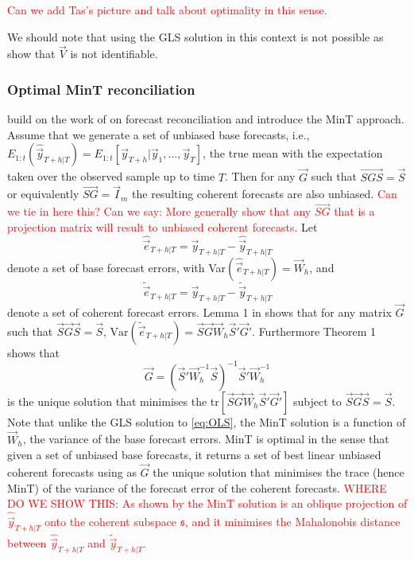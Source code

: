 \documentclass[graybox]{svmult}
\begin{document}
\textcolor{red}{Can we add Tas's picture and talk about optimality in this sense.}

We should note that using the GLS solution in this context is not possible as \cite{WicEtAl2019} show that $\vec{V}$ is not identifiable.


\subsubsection{Optimal MinT reconciliation}

\cite{WicEtAl2019} build on the work of \citet{HynEtAl2011} on forecast reconciliation and introduce the MinT approach. Assume that we generate a set of unbiased base forecasts, i.e., $E_{1:t}(\hat{\vec{y}}_{T+h|T})= E_{1:t}[\vec{y}_{T+h}|\vec{y}_1,...,\vec{y}_T]$, the true mean with the expectation taken over the observed sample up to time $T$. Then for any $\vec{G}$ such that $\vec{SGS}=\vec{S}$ or equivalently $\vec{SG}=\vec{I}_m$ the resulting coherent forecasts are also unbiased. \textcolor{red}{Can we tie in here this? Can we say: More generally \citep{Gamakumara2018} show that any $\vec{SG}$ that is a projection matrix will result to unbiased coherent forecasts}.
Let
\begin{equation}\label{eq:base errors}
\hat{\vec{e}}_{T+h|T} = \vec{y}_{T+h|T}-\hat{\vec{y}}_{T+h|T}
\end{equation}
denote a set of base forecast errors, with Var$(\hat{\vec{e}}_{T+h|T})=\vec{W}_h$, and 
\begin{equation*}
\tilde{\vec{e}}_{T+h|T} = \vec{y}_{T+h|T}-\tilde{\vec{y}}_{T+h|T}
\end{equation*} denote a set of coherent forecast errors. Lemma 1 in \cite{WicEtAl2019} shows that for any matrix $\vec{G}$ such that $\vec{S}\vec{G}\vec{S}=\vec{S}$, $\text{Var}(\tilde{\vec{e}}_{T+h|T})=\vec{S}\vec{G}\vec{W}_h\vec{S}'\vec{G}'
$. Furthermore Theorem 1 shows that
\begin{equation} \label{eq:MinT}
\vec{G} = (\vec{S}'{\vec{W}}^{-1}_h\vec{S})^{-1}\vec{S}'{\vec{W}}^{-1}_h
\end{equation}
is the unique solution that minimises the tr$[\vec{S}\vec{G}\vec{W}_h\vec{S}'\vec{G}']$ subject to $\vec{S}\vec{G}\vec{S}=\vec{S}$. Note that unlike the GLS solution to \eqref{eq:OLS}, the MinT solution is a function of $\vec{W}_h$, the variance of the base forecast errors. MinT is optimal in the sense that given a set of unbiased base forecasts, it returns a set of best linear unbiased coherent forecasts using as $\vec{G}$ the unique solution that minimises the trace (hence MinT) of the variance of the forecast error of the coherent forecasts. \textcolor{red}{WHERE DO WE SHOW THIS: As shown by \cite{WicEtAl2019} the MinT solution is an oblique projection of $\hat{\vec{y}}_{T+h|T}$ onto the coherent subspace $\mathfrak{s}$, and it minimises the Mahalonobis distance between $\hat{\vec{y}}_{T+h|T}$ and $\tilde{\vec{y}}_{T+h|T}$.}
\end{document}
